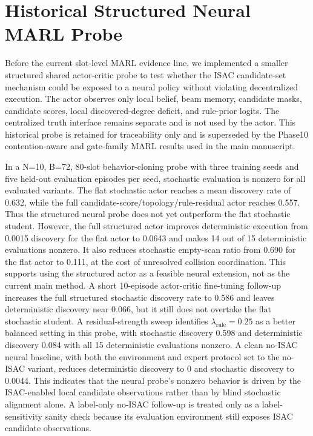 \documentclass[journal]{IEEEtran}
\begin{document}
\clearpage

\section{Historical Structured Neural MARL Probe}

Before the current slot-level MARL evidence line, we implemented a smaller structured shared actor-critic probe to test whether the ISAC candidate-set mechanism could be exposed to a neural policy without violating decentralized execution.
The actor observes only local belief, beam memory, candidate masks, candidate scores, local discovered-degree deficit, and rule-prior logits.
The centralized truth interface remains separate and is not used by the actor.
This historical probe is retained for traceability only and is superseded by the Phase10 contention-aware and gate-family MARL results used in the main manuscript.

In a N=10, B=72, 80-slot behavior-cloning probe with three training seeds and five held-out evaluation episodes per seed, stochastic evaluation is nonzero for all evaluated variants.
The flat stochastic actor reaches a mean discovery rate of 0.632, while the full candidate-score/topology/rule-residual actor reaches 0.557.
Thus the structured neural probe does not yet outperform the flat stochastic student.
However, the full structured actor improves deterministic execution from 0.0015 discovery for the flat actor to 0.0643 and makes 14 out of 15 deterministic evaluations nonzero.
It also reduces stochastic empty-scan ratio from 0.690 for the flat actor to 0.111, at the cost of unresolved collision coordination.
This supports using the structured actor as a feasible neural extension, not as the current main method.
A short 10-episode actor-critic fine-tuning follow-up increases the full structured stochastic discovery rate to 0.586 and leaves deterministic discovery near 0.066, but it still does not overtake the flat stochastic student.
A residual-strength sweep identifies $\lambda_{\mathrm{rule}}=0.25$ as a better balanced setting in this probe, with stochastic discovery 0.598 and deterministic discovery 0.084 with all 15 deterministic evaluations nonzero.
A clean no-ISAC neural baseline, with both the environment and expert protocol set to the no-ISAC variant, reduces deterministic discovery to 0 and stochastic discovery to 0.0044.
This indicates that the neural probe's nonzero behavior is driven by the ISAC-enabled local candidate observations rather than by blind stochastic alignment alone.
A label-only no-ISAC follow-up is treated only as a label-sensitivity sanity check because its evaluation environment still exposes ISAC candidate observations.
\end{document}
